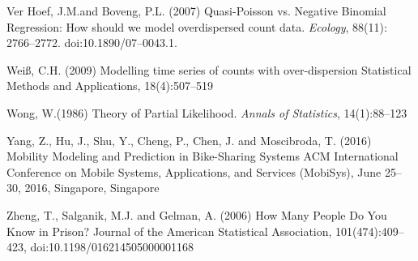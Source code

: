 \documentclass[11pt,twoside,openany]{article}
\begin{document}
\begin{thebibliography}{99}
Ver Hoef, J.\;M.\;and Boveng, P.\;L. (2007)
\newblock Quasi-Poisson vs. Negative Binomial Regression: How should we model overdispersed count data.
\newblock\emph{ Ecology}, 88(11): 2766--2772. doi:10.1890/07--0043.1.

Wei{\ss}, C.\;H. (2009)
\newblock Modelling time series of counts with over-dispersion
\newblock Statistical Methods and Applications, 18(4):507--519


Wong, W.\;(1986)
\newblock Theory of Partial Likelihood.
\newblock \emph{Annals of Statistics}, 14(1):88--123

Yang, Z., Hu, J., Shu, Y., Cheng, P., Chen, J. and Moscibroda, T. (2016)
\newblock Mobility Modeling and Prediction in Bike-Sharing Systems
\newblock ACM International Conference on Mobile Systems, Applications, and Services (MobiSys),
June 25--30, 2016, Singapore, Singapore

Zheng, T., Salganik, M.\;J. and Gelman, A. (2006)
\newblock How Many People Do You Know in Prison?
\newblock Journal of the American Statistical Association, 101(474):409--423, doi:10.1198/016214505000001168

\end{thebibliography}
\end{document}

